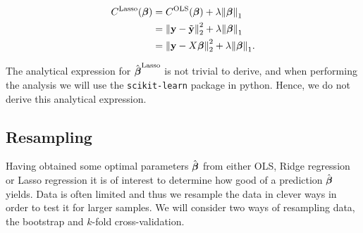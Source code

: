 \begin{align*}
    C^\text{Lasso}(\boldsymbol{\beta})  &= C^\text{OLS}(\boldsymbol{\beta}) + \lambda \norm{\boldsymbol{\beta}}_1 \\
    &= \norm{\mathbf{y}-\tilde{\mathbf{y}}}_2^{2}  + \lambda \norm{\boldsymbol{\beta}}_{1} \\
    &= \norm{\mathbf{y}-X\boldsymbol{\beta}}_2^{2} + \lambda \norm{\boldsymbol{\beta}}_{1}.
\end{align*}

The analytical expression for $\hat{\boldsymbol{\beta}}^{\text{Lasso}}$ is not trivial to derive, and when performing the analysis we will use the \texttt{scikit-learn} package in python. Hence, we do not derive this analytical expression. 

\subsection{Resampling}\label{sec:resampling}
Having obtained some optimal parameters $\hat{\boldsymbol{\beta}}$ from either OLS, Ridge regression or Lasso regression it is of interest to determine how good of a prediction $\hat{\boldsymbol{\beta}}$ yields. Data is often limited and thus we resample the data in clever ways in order to test it for larger samples. We will consider two ways of resampling data, the bootstrap and $k$-fold cross-validation. 

